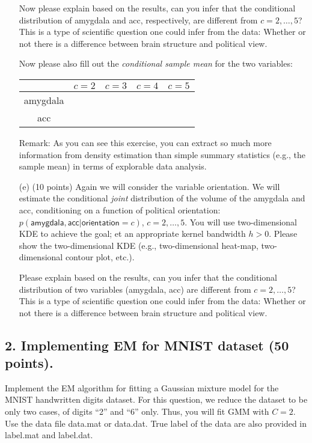 \documentclass[12pt]{article}
\begin{document}
\begin{enumerate}
 
Now please explain based on the results, can you infer that the conditional distribution of  \textsf{amygdala} and \textsf{acc}, respectively, are different from $c = 2, \ldots, 5$? This is a type of scientific question one could infer from the data: Whether or not there is a difference between brain structure and political view. 

Now please also fill out the {\it conditional sample mean} for the two variables: %
\begin{center}
\begin{tabular}{|c|c|c|c|c|}
\hline
& $c = 2$ & $c = 3$ & $c = 4$ & $c = 5$ \\\hline
\textsf{amygdala} & & & & \\\hline
\textsf{acc} & & & & \\\hline
\end{tabular}
\end{center}
Remark: As you can see this exercise, you can extract so much more information from density estimation than simple summary statistics (e.g., the sample mean) in terms of explorable data analysis.  
 
 \item[(e)] (10 points) Again we will consider the variable \textsf{orientation}. We will estimate the conditional {\it joint} distribution of the volume of the \textsf{amygdala} and \textsf{acc}, conditioning on  a function of political \textsf{orientation}: $p(\textsf{amygdala}, \textsf{acc}|\textsf{orientation}=c)$, $c = 2, \ldots, 5$. You will use two-dimensional KDE to achieve the goal; et an appropriate kernel bandwidth $h >0$. Please show the two-dimensional KDE (e.g., two-dimensional heat-map, two-dimensional contour plot, etc.). 
 
 Please explain based on the results, can you infer that the conditional distribution of two variables (\textsf{amygdala}, \textsf{acc}) are different from $c = 2, \ldots, 5$? This is a type of scientific question one could infer from the data: Whether or not there is a difference between brain structure and political view.
 
  
 \end{enumerate}


\subsection*{2. Implementing EM for MNIST dataset (50 points).}

Implement the EM algorithm for fitting a Gaussian mixture model for the MNIST handwritten digits dataset. For this question, we reduce the dataset to be only two cases, of digits ``2'' and ``6'' only. Thus, you will fit GMM with $C = 2$. Use the data file \textsf{data.mat} or \textsf{data.dat}. True label of the data are also provided in \textsf{label.mat} and \textsf{label.dat}.
\\
\end{document}
